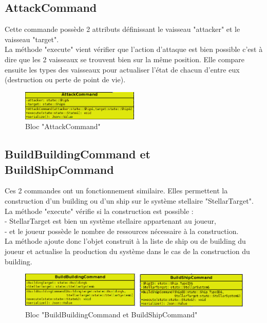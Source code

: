 \subsection{AttackCommand}

Cette commande possède 2 attributs définissant le vaisseau "attacker" et le vaisseau "target". \\
La méthode "execute" vient vérifier que l'action d'attaque est bien possible c'est à dire que les 2 vaisseaux se trouvent bien sur la même position. Elle compare ensuite les types des vaisseaux pour actualiser l'état de chacun d'entre eux (destruction ou perte de point de vie).
\\
\begin{figure}[!h]
\centering
\includegraphics[width=0.5\textwidth]{pics/engine_pics/AttackCommand.PNG}
\caption[Bloc "AttackCommand"]{\label{figure_simple}Bloc "AttackCommand"}
\end{figure}

\subsection{BuildBuildingCommand et BuildShipCommand}

Ces 2 commandes ont un fonctionnement similaire. Elles permettent la construction d'un building ou d'un ship sur le système stellaire "StellarTarget". \\ La méthode "execute" vérifie si la construction est possible : \\
- StellarTarget est bien un système stellaire appartenant au joueur,\\
- et le joueur possède le nombre de ressources nécessaire à la construction. \\
La méthode ajoute donc l'objet construit à la liste de ship ou de building du joueur et actualise la production du système dans le cas de la construction du building.
\\
\begin{figure}[!h]
\centering
\includegraphics[width=1\textwidth]{pics/engine_pics/BuildsCommand.PNG}
\caption[Bloc "BuildBuildingCommand et BuildShipCommand"]{\label{figure_simple}Bloc "BuildBuildingCommand et BuildShipCommand"}
\end{figure}


